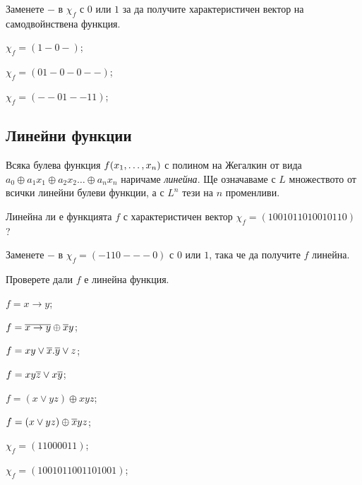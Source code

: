 \begin{problem}
  Заменете $-$ в $\chi_f$ с $0$ или $1$ за да получите характеристичен вектор на самодвойнствена функция.\\
  \begin{inparaenum}[a)]
  \item
    $\chi_f = (1-0-)$;
  \item
    $\chi_f = (01-0-0--)$;
  \item
    $\chi_f = (--01--11)$;
  \end{inparaenum}
\end{problem}

\subsection{Линейни функции}

Всяка булева функция $f(x_{1},\dots,x_{n})$ с полином на Жегалкин от вида 
$a_0\oplus a_1x_1 \oplus a_2x_2 \dots\oplus a_nx_n$ наричаме {\em линейна}.
Ще означаваме с $L$ множеството от всички линейни булеви функции, а с $L^n$ тези на $n$ променливи.

\begin{problem}
  Линейна ли е функцията $f$ с характеристичен вектор $\chi_f = (1001011010010110)$ ?
\end{problem}

\begin{problem}
  Заменете $-$ в $\chi_f = (-110---0)$ с $0$ или $1$, така че да получите $f$ линейна.
\end{problem}


\begin{problem}
  Проверете дали $f$ е линейна функция.\\
  \begin{inparaenum}[a)]
  \item
    $f = x\rightarrow y$;
  \item
    $f = \overline{x\rightarrow y}\oplus \overline{x}y$;
  \item
    $f = xy\vee \overline{x}.\overline{y}\vee z$;
  \item
    $f = xy\overline{z}\vee x\overline{y}$;
  \item
    $f = (x\vee yz)\oplus xyz$;
  \item
    $f = (x\vee yz)\oplus \overline{x}yz$;
  \item
    $\chi_f = (1100 0011)$;
  \item
    $\chi_f = (1001 0110 0110 1001)$;
  \end{inparaenum}
\end{problem}

